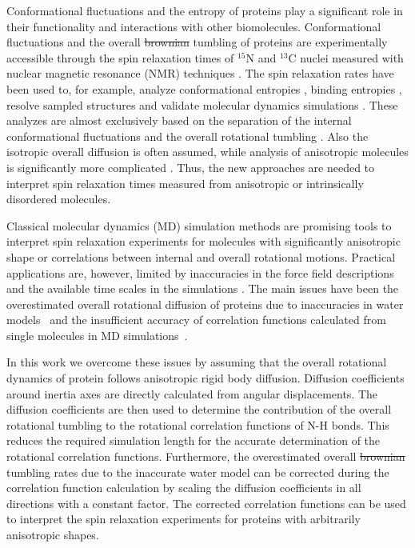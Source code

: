 \documentclass[journal=jpcbfk,manuscript=article]{achemso}
\providecommand{\DIFadd}[1]{{\protect\color{blue}\uwave{#1}}} %
\providecommand{\DIFdel}[1]{{\protect\color{red}\sout{#1}}}                      %
\providecommand{\DIFaddbegin}{} %
\providecommand{\DIFaddend}{} %
\providecommand{\DIFdelbegin}{} %
\providecommand{\DIFdelend}{} %
\begin{document}
Conformational fluctuations and the entropy of proteins
play a significant role in their functionality
and interactions with other biomolecules.
Conformational fluctuations and the overall \DIFdelbegin \DIFdel{brownian }\DIFdelend \DIFaddbegin \DIFadd{Brownian }\DIFaddend tumbling of proteins
are experimentally accessible through the 
spin relaxation times of $^{15}$N and $^{13}$C nuclei measured
with nuclear magnetic resonance (NMR) 
techniques \cite{jarymowycz06,korzhnev01,mulder01,eisenmesser05,bedem15,lewandowski15,lamley15}. 
The spin relaxation rates have been used to, for example, analyze
conformational entropies \cite{yang96,kasinath13,allner15,jarymowycz06}, binding entropies \cite{akke93,jarymowycz06},
resolve sampled structures \cite{mulder01,eisenmesser05,bedem15,medina14}
and validate molecular dynamics simulations \cite{best04,showalter07a,showalter07b,maragakis08,trbovic08}.
These analyzes are almost exclusively based on the
separation of the internal conformational fluctuations 
and the overall rotational tumbling \cite{wennerstrom79,Lipari82}.
Also the isotropic overall diffusion is often assumed, while
analysis of anisotropic molecules is significantly more
complicated \cite{woessner62,shimizu62,jarymowycz06,korzhnev01,luginbuhl97,hall04}.
Thus, the new approaches are needed to interpret spin relaxation times
measured from anisotropic or intrinsically disordered molecules.

Classical molecular dynamics (MD) simulation methods are
promising tools to interpret spin relaxation experiments
for molecules with significantly anisotropic shape or correlations between
internal and overall rotational motions. Practical applications
are, however, limited by inaccuracies in the force field descriptions
and the available time scales in the simulations \cite{prompers02,maragakis08,trbovic08,wong08,anderson12}.
The main issues have been the overestimated overall rotational diffusion of proteins
due to inaccuracies in water models~\cite{wong08} and the
insufficient accuracy of correlation functions calculated from
single molecules in MD simulations~\cite{lu06,anderson12}.

In this work we overcome these issues by assuming that the overall
rotational dynamics of protein follows anisotropic rigid body diffusion.
Diffusion coefficients around inertia axes are 
directly calculated from angular displacements.
The diffusion coefficients are then used to determine the
contribution of the overall rotational tumbling to the 
rotational correlation functions of N-H bonds.
This reduces the required simulation length for the accurate determination
of the rotational correlation functions. Furthermore, the overestimated
overall \DIFdelbegin \DIFdel{brownian }\DIFdelend \DIFaddbegin \DIFadd{Brownian }\DIFaddend tumbling rates due to the inaccurate water model
can be corrected during the correlation function calculation by scaling
the diffusion coefficients in all directions with a constant factor.
The corrected correlation functions can be used to interpret the spin relaxation
experiments for proteins with arbitrarily anisotropic shapes.
\end{document}
